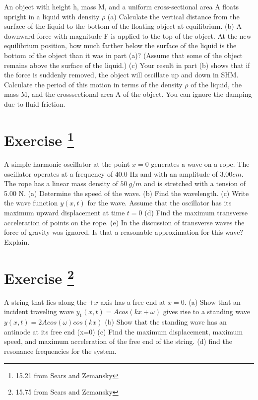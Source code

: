 \documentclass[12pt]{article}
\begin{document}
An object with
height h, mass M, and a uniform cross-sectional area A floats
upright in a liquid with density $\rho$ (a) Calculate the vertical distance
from the surface of the liquid to the bottom of the floating
object at equilibrium. (b) A downward force with magnitude F is
applied to the top of the object. At the new equilibrium position,
how much farther below the surface of the liquid is the bottom of
the object than it was in part (a)? (Assume that some of the object
remains above the surface of the liquid.) (c) Your result in part (b)
shows that if the force is suddenly removed, the object will oscillate
up and down in SHM. Calculate the period of this motion in
terms of the density $\rho$ of the liquid, the mass M, and the crosssectional
area A of the object. You can ignore the damping due to
fluid friction.





\section*{Exercise \theexample \footnote{15.21 from Sears and Zemansky}}


A simple harmonic oscillator at the point $x=0$ generates
a wave on a rope. The oscillator operates at a frequency of 40.0 Hz
and with an amplitude of $3.00 cm$. The rope has a linear mass density
of $50~g/m$ and is stretched with a tension of 5.00 N.
(a) Determine the speed of the wave. (b) Find the wavelength.
(c) Write the wave function $y(x,t)$ for the wave. Assume that the
oscillator has its maximum upward displacement at time $t=0$
(d) Find the maximum transverse acceleration of points on the
rope. (e) In the discussion of transverse waves  the
force of gravity was ignored. Is that a reasonable approximation
for this wave? Explain.




\section*{Exercise \theexample \footnote{15.75 from Sears and Zemansky}}

A string that lies along the $+x$-axis has a free end
at $x=0$. (a) Show that an incident traveling wave $y_1(x,t)=Acos(kx+\omega )$ 
gives rise to a standing wave $y(x,t)=2Acos(\omega )cos(k x)$ 
(b) Show that the standing wave has an antinode
at its free end (x=0) (c) Find the maximum displacement, maximum
speed, and maximum acceleration of the free end of the string. (d) find the resonance frequencies 
for the system.
\end{document}
